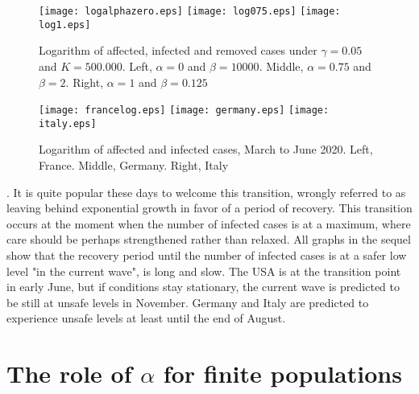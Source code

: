 \documentclass{article}
\begin{document}
\begin{figure}
\begin{center}
{\texttt{[image: logalphazero.eps]}}
\qquad
{\texttt{[image: log075.eps]}}
\qquad
{\texttt{[image: log1.eps]}}
\end{center}
\caption{Logarithm of affected, infected and removed cases under $\gamma=0.05$  and $K=500.000$. Left, $\alpha=0$ and $\beta=10000$. Middle, $\alpha=0.75$ and $\beta=2$. Right, $\alpha=1$  and $\beta=0.125$}
\label{log075}
\end{figure}


\bigskip

\begin{figure}
\begin{center}
{\texttt{[image: francelog.eps]}}
 \qquad
{\texttt{[image: germany.eps]}}
 \qquad
{\texttt{[image: italy.eps]}}
\end{center}
\caption{Logarithm of affected and infected cases, March to June 2020. Left, France. Middle, Germany. Right, Italy}
\label{france}
\end{figure}


. It is quite popular these days to welcome this transition, wrongly referred to as leaving behind exponential growth in favor of a period of recovery. This transition occurs at the moment when the number of infected cases is at a maximum, where care should be perhaps strengthened rather than relaxed. All graphs in the sequel show that the recovery period until the number of infected cases is at a safer low level "in the current wave", is long and slow.  The USA is at the transition point in early June, but if conditions stay stationary, the current wave is predicted to be still at unsafe levels in November. Germany and Italy are predicted to experience unsafe levels at least until the end of August.

\section{The role of $\alpha$ for finite populations}
\end{document}
